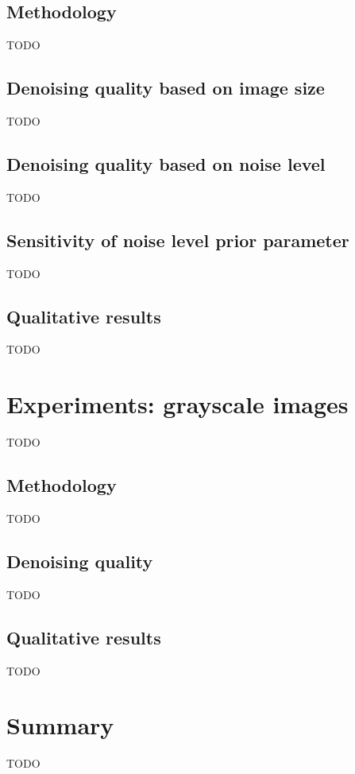\documentclass[a4paper, 11pt, onecolumn, openany, titlepage]{report}
\newcommand\numberedchapter[1]{\setlength\topskip{3cm}\chapter{#1}\setlength\topskip{0cm}}
\theoremstyle{default_theorem_style}\newtheorem{theorem}{Theorem}
\theoremstyle{default_theorem_style}\newtheorem{definition}{Definition}
\begin{document}
\section{Methodology}

TODO

\section{Denoising quality based on image size}

TODO

\section{Denoising quality based on noise level}

TODO

\section{Sensitivity of noise level prior parameter}

TODO

\section{Qualitative results}

TODO

\numberedchapter{Experiments: grayscale images}

TODO

\section{Methodology}

TODO

\section{Denoising quality}

TODO

\section{Qualitative results}

TODO

\numberedchapter{Summary}

TODO
\end{document}
